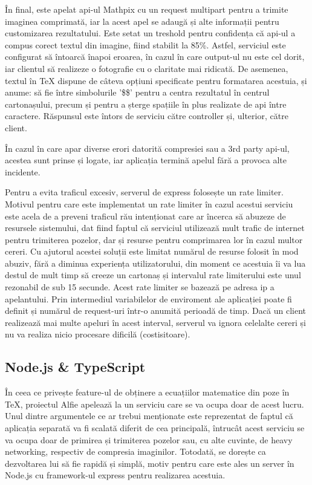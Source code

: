 În final, este apelat api-ul Mathpix cu un request multipart pentru a trimite imaginea comprimată, iar la acest apel se adaugă și alte informații pentru customizarea rezultatului. Este setat un treshold pentru confidența că api-ul a compus corect textul din imagine, fiind stabilit la 85\%. Astfel, serviciul este configurat să întoarcă înapoi eroarea, în cazul în care output-ul nu este cel dorit, iar clientul să realizeze o fotografie cu o claritate mai ridicată. De asemenea, textul în TeX dispune de câteva opțiuni specificate pentru formatarea acestuia, și anume: să fie între simbolurile ’\$\$’ pentru a centra rezultatul în centrul cartonașului, precum și pentru a șterge spațiile în plus realizate de api între caractere. Răspunsul este întors de serviciu către controller și, ulterior, către client.

În cazul în care apar diverse erori datorită compresiei sau a 3rd party api-ul, acestea sunt prinse și logate, iar aplicația termină apelul fără a provoca alte incidente.

Pentru a evita traficul excesiv, serverul de express folosește un rate limiter. Motivul pentru care este implementat un rate limiter în cazul acestui serviciu este acela de a preveni traficul rău intenționat care ar încerca să abuzeze de resursele sistemului, dat fiind faptul că serviciul utilizează mult trafic de internet pentru trimiterea pozelor, dar și resurse pentru comprimarea lor în cazul multor cereri. Cu ajutorul acestei soluții este limitat numărul de resurse folosit în mod abuziv, fără a diminua experiența utilizatorului, din moment ce acestuia îi va lua destul de mult timp să creeze un cartonaș și intervalul rate limiterului este unul rezonabil de sub 15 secunde. Acest rate limiter se bazează pe adresa ip a apelantului. Prin intermediul variabilelor de enviroment ale aplicației poate fi definit și numărul de request-uri într-o anumită perioadă de timp. Dacă un client realizează mai multe apeluri în acest interval, serverul va ignora celelalte cereri și nu va realiza nicio procesare dificilă (costisitoare).

\subsection{Node.js \& TypeScript}

În ceea ce privește feature-ul de obținere a ecuațiilor matematice din poze în TeX, proiectul Alfie apelează la un serviciu care se va ocupa doar de acest lucru. Unul dintre argumentele ce ar trebui menționate este reprezentat de faptul că aplicația separată va fi scalată diferit de cea principală, întrucât acest serviciu se va ocupa doar de primirea și trimiterea pozelor sau, cu alte cuvinte, de heavy networking, respectiv de compresia imaginilor. Totodată, se dorește ca dezvoltarea lui să fie rapidă și simplă, motiv pentru care este ales un server în Node.js cu framework-ul express pentru realizarea acestuia.

